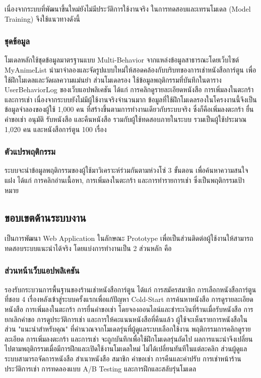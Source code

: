 เนื่องจากระบบที่พัฒนาขึ้นใหม่ยังไม่มีประวัติการใช้งานจริง ในการทดสอบและเทรนโมเดล (Model Training) จึงใช้แนวทางดังนี้

\subsubsection{ชุดข้อมูล}
โมเดลหลักใช้ชุดข้อมูลมาตรฐานแบบ Multi-Behavior จากแหล่งข้อมูลสาธารณะโดยเว็บไซต์ MyAnimeList นำมาจำลองและจัดรูปแบบใหม่ให้สอดคล้องกับบริบทของการเช่าหนังสือการ์ตูน เพื่อใช้ฝึกโมเดลและวัดผลความแม่นยำ ส่วนโมเดลรอง ใช้ข้อมูลพฤติกรรมที่บันทึกในตาราง UserBehaviorLog ของเว็บแอปพลิเคชัน ได้แก่ การคลิกดูรายละเอียดหนังสือ การเพิ่มลงในตะกร้า และการเช่า เนื่องจากระบบยังไม่มีผู้ใช้งานจริงจำนวนมาก ข้อมูลที่ใช้ฝึกโมเดลรองในโครงงานนี้จึงเป็นข้อมูลจำลองของผู้ใช้ 1,000 คน ที่สร้างขึ้นตามการทำงานเดียวกับระบบจริง ซึ่งก็คือเพิ่มลงตะกร้า ยื่นคำขอเช่า อนุมัติ รับหนังสือ และคืนหนังสือ รวมกับผู้ใช้ทดสอบภายในระบบ รวมเป็นผู้ใช้ประมาณ 1,020 คน และหนังสือการ์ตูน 100 เรื่อง

\subsubsection{ตัวแปรพฤติกรรม}
ระบบจะนำข้อมูลพฤติกรรมของผู้ใช้มาวิเคราะห์ร่วมกันตามห่วงโซ่ 3 ขั้นตอน เพื่อค้นหาความสนใจแฝง ได้แก่ การคลิกอ่านเนื้อหา, การเพิ่มลงในตะกร้า และการทำรายการเช่า ซึ่งเป็นพฤติกรรมเป้าหมาย

\subsection{ขอบเขตด้านระบบงาน}

เป็นการพัฒนา Web Application ในลักษณะ Prototype เพื่อเป็นส่วนติดต่อผู้ใช้งานให้สามารถทดสอบระบบแนะนำได้จริง โดยแบ่งการทำงานเป็น 2 ส่วนหลัก คือ

\subsubsection{ส่วนหน้าเว็บแอปพลิเคชัน}
รองรับกระบวนการพื้นฐานของร้านเช่าหนังสือการ์ตูน ได้แก่ การสมัครสมาชิก การเลือกหนังสือการ์ตูนที่ชอบ 4 เรื่องหลังเข้าสู่ระบบครั้งแรกเพื่อแก้ปัญหา Cold-Start การค้นหาหนังสือ การดูรายละเอียดหนังสือ การเพิ่มลงในตะกร้า การยื่นคำขอเช่า โดยจองออนไลน์และชำระเงินที่ร้านเมื่อรับหนังสือ การยกเลิกคำขอ การดูประวัติการเช่า และการให้คะแนนหนังสือที่คืนแล้ว ผู้ใช้จะเห็นรายการหนังสือในส่วน "แนะนำสำหรับคุณ" ที่คำนวณจากโมเดลรุ่นที่ผู้ดูแลระบบเลือกใช้งาน พฤติกรรมการคลิกดูรายละเอียด การเพิ่มลงตะกร้า และการเช่า จะถูกบันทึกเพื่อใช้ฝึกโมเดลรุ่นถัดไป ผลการแนะนำจึงเปลี่ยนไปตามพฤติกรรมเมื่อมีการฝึกและเปิดใช้งานโมเดลใหม่ ไม่ได้เปลี่ยนทันทีในแต่ละคลิก ส่วนผู้ดูแลระบบสามารถจัดการหนังสือ สำเนาหนังสือ สมาชิก คำขอเช่า การคืนและค่าปรับ การเช่าหน้าร้าน ประวัติการเช่า การทดลองแบบ A/B Testing และการฝึกและสลับรุ่นโมเดล

